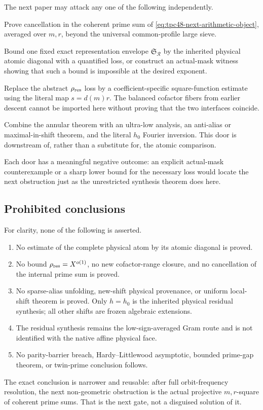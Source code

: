 The next paper may attack any one of the following independently.
\begin{description}[leftmargin=2.8em,style=nextline]
 \item[Door A: coefficient-specific prime square.] Prove cancellation
   in the coherent prime sum of
   \eqref{eq:tpc48-next-arithmetic-object}, averaged over \(m,r\),
   beyond the universal common-profile large sieve.
 \item[Door B: projective-to-atomic comparison.] Bound one fixed exact
   representation envelope \(\mathfrak S_{\mathscr R}\) by the
   inherited physical atomic diagonal with a quantified loss, or
   construct an actual-mask witness showing that such a bound is
   impossible at the desired exponent.
 \item[Door C: residual grouping with cofactor structure.] Replace the
   abstract \(\rho_{\rm res}\) loss by a coefficient-specific
   square-function estimate using the literal map \(s=d(m)r\).  The
   balanced cofactor fibers from earlier descent cannot be imported
   here without proving that the two interfaces coincide.
 \item[Door D: localization and alias completion.] Combine the
   annular theorem with an ultra-low analysis, an anti-alias or
   maximal-in-shift theorem, and the literal \(h_0\) Fourier inversion.
   This door is downstream of, rather than a substitute for, the
   atomic comparison.
\end{description}

Each door has a meaningful negative outcome: an explicit actual-mask
counterexample or a sharp lower bound for the necessary loss would
locate the next obstruction just as the unrestricted synthesis theorem
does here.

\subsection{Prohibited conclusions}

For clarity, none of the following is asserted.
\begin{enumerate}[label=\textup{(\roman*)},leftmargin=2.4em]
 \item No estimate of the complete physical atom by its atomic
       diagonal is proved.
 \item No bound \(\rho_{\rm res}=X^{o(1)}\), no new cofactor-range
       closure, and no cancellation of the internal prime sum is
       proved.
 \item No sparse-alias unfolding, new-shift physical provenance, or
       uniform local-shift theorem is proved.  Only \(h=h_0\) is the
       inherited physical residual synthesis; all other shifts are
       frozen algebraic extensions.
 \item The residual synthesis remains the low-sign-averaged Gram
       route and is not identified with the native affine physical
       face.
 \item No parity-barrier breach, Hardy--Littlewood asymptotic, bounded
       prime-gap theorem, or twin-prime conclusion follows.
\end{enumerate}

The exact conclusion is narrower and reusable: after full
orbit-frequency resolution, the next non-geometric obstruction is the
actual projective \(m,r\)-square of coherent prime sums.  That is the
next gate, not a disguised solution of it.
